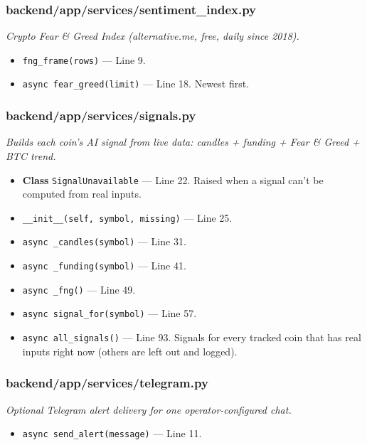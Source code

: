 \subsubsection*{backend/app/services/sentiment\_index.py}
\textit{Crypto Fear \& Greed Index (alternative.me, free, daily since 2018).}
\begin{itemize}[nosep,leftmargin=1.5em]
\item \texttt{fng\_\allowbreak{}frame(\allowbreak{}rows)} --- Line 9.
\item \texttt{async fear\_\allowbreak{}greed(\allowbreak{}limit)} --- Line 18. Newest first.
\end{itemize}
\subsubsection*{backend/app/services/signals.py}
\textit{Builds each coin's AI signal from live data: candles + funding + Fear \& Greed + BTC trend.}
\begin{itemize}[nosep,leftmargin=1.5em]
\item \textbf{Class} \texttt{SignalUnavailable} --- Line 22. Raised when a signal can't be computed from real inputs.
\item \hspace*{1em}\texttt{\_\allowbreak{}\_\allowbreak{}init\_\allowbreak{}\_\allowbreak{}(\allowbreak{}self,\allowbreak{} symbol,\allowbreak{} missing)} --- Line 25.
\item \texttt{async \_\allowbreak{}candles(\allowbreak{}symbol)} --- Line 31.
\item \texttt{async \_\allowbreak{}funding(\allowbreak{}symbol)} --- Line 41.
\item \texttt{async \_\allowbreak{}fng(\allowbreak{})} --- Line 49.
\item \texttt{async signal\_\allowbreak{}for(\allowbreak{}symbol)} --- Line 57.
\item \texttt{async all\_\allowbreak{}signals(\allowbreak{})} --- Line 93. Signals for every tracked coin that has real inputs right now (others are left out and logged).
\end{itemize}
\subsubsection*{backend/app/services/telegram.py}
\textit{Optional Telegram alert delivery for one operator-configured chat.}
\begin{itemize}[nosep,leftmargin=1.5em]
\item \texttt{async send\_\allowbreak{}alert(\allowbreak{}message)} --- Line 11.
\end{itemize}
